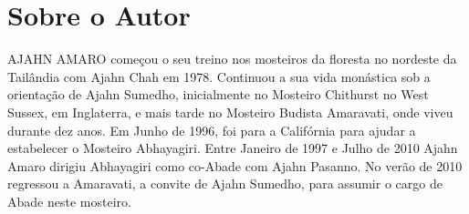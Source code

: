 \chapter{Sobre o Autor}

AJAHN AMARO começou o seu treino nos mosteiros da floresta no nordeste
da Tailândia com Ajahn Chah em 1978. Continuou a sua vida monástica sob
a orientação de Ajahn Sumedho, inicialmente no Mosteiro Chithurst no
West Sussex, em Inglaterra, e mais tarde no Mosteiro Budista Amaravati,
onde viveu durante dez anos. Em Junho de 1996, foi para a Califórnia
para ajudar a estabelecer o Mosteiro Abhayagiri. Entre Janeiro de 1997 e
Julho de 2010 Ajahn Amaro dirigiu Abhayagiri como co-Abade com Ajahn
Pasanno. No verão de 2010 regressou a Amaravati, a convite de Ajahn
Sumedho, para assumir o cargo de Abade neste mosteiro.
